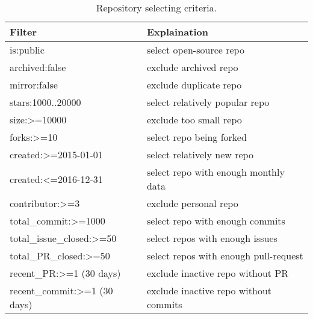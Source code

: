 \documentclass[sigconf,review,anonymous]{acmart}
\begin{document}
\begin{table}[!b]
\caption{Repository selecting criteria.}
\label{tbl:select}
\begin{adjustbox}{max width=0.48\textwidth}
\begin{tabular}{l|l}
\rowcolor[HTML]{BDBDBD} 
{\color[HTML]{000000} Filter} & {\color[HTML]{000000} Explaination} \\ \hline
\rowcolor[HTML]{FFFFFF} 
{\color[HTML]{000000} is:public} & {\color[HTML]{000000} select open-source repo} \\
\rowcolor[HTML]{F3F3F3} 
{\color[HTML]{000000} archived:false} & {\color[HTML]{000000} exclude archived repo} \\
\rowcolor[HTML]{FFFFFF} 
{\color[HTML]{000000} mirror:false} & {\color[HTML]{000000} exclude duplicate repo} \\
\rowcolor[HTML]{F3F3F3} 
{\color[HTML]{000000} stars:1000..20000} & {\color[HTML]{000000} select relatively popular repo} \\
\rowcolor[HTML]{FFFFFF} 
{\color[HTML]{000000} size:\textgreater{}=10000} & {\color[HTML]{000000} exclude too small repo} \\
\rowcolor[HTML]{F3F3F3} 
{\color[HTML]{000000} forks:\textgreater{}=10} & {\color[HTML]{000000} select repo being forked} \\
\rowcolor[HTML]{FFFFFF} 
{\color[HTML]{000000} created:\textgreater{}=2015-01-01} & {\color[HTML]{000000} select relatively new repo} \\
\rowcolor[HTML]{F3F3F3} 
{\color[HTML]{000000} created:\textless{}=2016-12-31} & {\color[HTML]{000000} select repo with enough monthly data} \\
\rowcolor[HTML]{FFFFFF} 
{\color[HTML]{000000} contributor:\textgreater{}=3} & {\color[HTML]{000000} exclude personal repo} \\
\rowcolor[HTML]{F3F3F3} 
{\color[HTML]{000000} total\_commit:\textgreater{}=1000} & {\color[HTML]{000000} select repo with enough commits} \\
\rowcolor[HTML]{FFFFFF} 
{\color[HTML]{000000} total\_issue\_closed:\textgreater{}=50} & {\color[HTML]{000000} select repos with enough issues} \\
\rowcolor[HTML]{F3F3F3} 
{\color[HTML]{000000} total\_PR\_closed:\textgreater{}=50} & {\color[HTML]{000000} select repos with enough pull-request} \\
\rowcolor[HTML]{FFFFFF} 
{\color[HTML]{000000} recent\_PR:\textgreater{}=1 (30 days)} & {\color[HTML]{000000} exclude inactive repo without PR} \\
\rowcolor[HTML]{F3F3F3} 
{\color[HTML]{000000} recent\_commit:\textgreater{}=1 (30 days)} & {\color[HTML]{000000} exclude inactive repo without commits}
\end{tabular}
\end{adjustbox}
\end{table}
\end{document}

